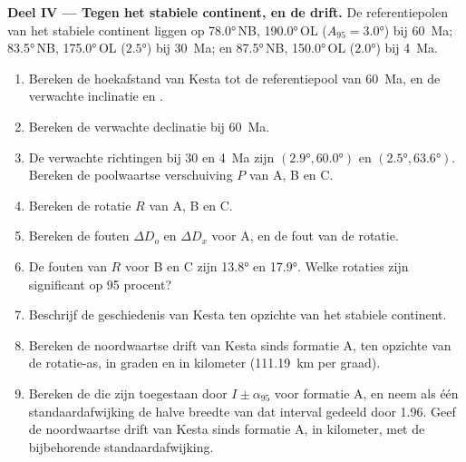 \begin{problem}
\medskip\noindent\textbf{Deel IV --- Tegen het stabiele continent, en de drift.} De
referentiepolen van het stabiele continent liggen op \ang{78.0}\,NB, \ang{190.0}\,OL
($A_{95} = \ang{3.0}$) bij \qty{60}{Ma}; \ang{83.5}\,NB, \ang{175.0}\,OL
($\ang{2.5}$) bij \qty{30}{Ma}; en \ang{87.5}\,NB, \ang{150.0}\,OL ($\ang{2.0}$)
bij \qty{4}{Ma}.
\begin{enumerate}[resume]
  \item Bereken de hoekafstand van Kesta tot de referentiepool van \qty{60}{Ma},
        en de verwachte inclinatie en .
  \item Bereken de verwachte declinatie bij \qty{60}{Ma}.
  \item De verwachte richtingen bij 30 en \qty{4}{Ma} zijn $(\ang{2.9},
        \ang{60.0})$ en $(\ang{2.5}, \ang{63.6})$. Bereken de poolwaartse
        verschuiving $P$ van A, B en C.
  \item Bereken de rotatie $R$ van A, B en C.
  \item Bereken de fouten $\Delta D_o$ en $\Delta D_x$ voor A, en de fout
        van de rotatie.
  \item De fouten van $R$ voor B en C zijn \ang{13.8} en \ang{17.9}. Welke
        rotaties zijn significant op 95 procent?
  \item Beschrijf de geschiedenis van Kesta ten opzichte van het stabiele continent.
  \item Bereken de noordwaartse drift van Kesta sinds formatie A, ten opzichte van
        de rotatie-as, in graden en in kilometer
        (\qty{111.19}{km} per graad).
  \item Bereken de  die zijn toegestaan door $I \pm \alpha_{95}$ voor
        formatie A, en neem als één standaardafwijking de halve breedte van dat
        interval gedeeld door 1.96. Geef de noordwaartse drift van Kesta sinds formatie
        A, in kilometer, met de bijbehorende standaardafwijking.
\end{enumerate}
\end{problem}
